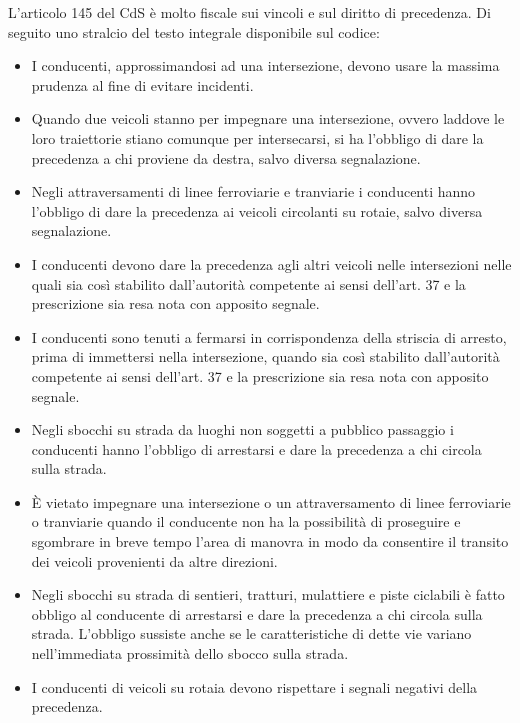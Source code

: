 L'articolo 145\cite{CdsTitV} del CdS è molto fiscale sui vincoli e sul diritto di precedenza. Di seguito uno stralcio del testo integrale disponibile sul codice:
\begin{itemize}
	\item I conducenti, approssimandosi ad una intersezione, devono usare la massima prudenza al fine di evitare incidenti.

\item  Quando due veicoli stanno per impegnare una intersezione, ovvero laddove le loro traiettorie stiano comunque per intersecarsi, si ha l'obbligo di dare la precedenza a chi proviene da destra, salvo diversa segnalazione.

\item  Negli attraversamenti di linee ferroviarie e tranviarie i conducenti hanno l'obbligo di dare la precedenza ai veicoli circolanti su rotaie, salvo diversa segnalazione.

\item  I conducenti devono dare la precedenza agli altri veicoli nelle intersezioni nelle quali sia così stabilito dall'autorità competente ai sensi dell'art. 37 e la prescrizione sia resa nota con apposito segnale.

\item  I conducenti sono tenuti a fermarsi in corrispondenza della striscia di arresto, prima di immettersi nella intersezione, quando sia così stabilito dall'autorità competente ai sensi dell'art. 37 e la prescrizione sia resa nota con apposito segnale.

\item  Negli sbocchi su strada da luoghi non soggetti a pubblico passaggio i conducenti hanno l'obbligo di arrestarsi e dare la precedenza a chi circola sulla strada.

\item È vietato impegnare una intersezione o un attraversamento di linee ferroviarie o tranviarie quando il conducente non ha la possibilità di proseguire e sgombrare in breve tempo l'area di manovra in modo da consentire il transito dei veicoli provenienti da altre direzioni.

\item  Negli sbocchi su strada di sentieri, tratturi, mulattiere e piste ciclabili è fatto obbligo al conducente di arrestarsi e dare la precedenza a chi circola sulla strada. L'obbligo sussiste anche se le caratteristiche di dette vie variano nell'immediata prossimità dello sbocco sulla strada.

\item  I conducenti di veicoli su rotaia devono rispettare i segnali negativi della precedenza.

\end{itemize}